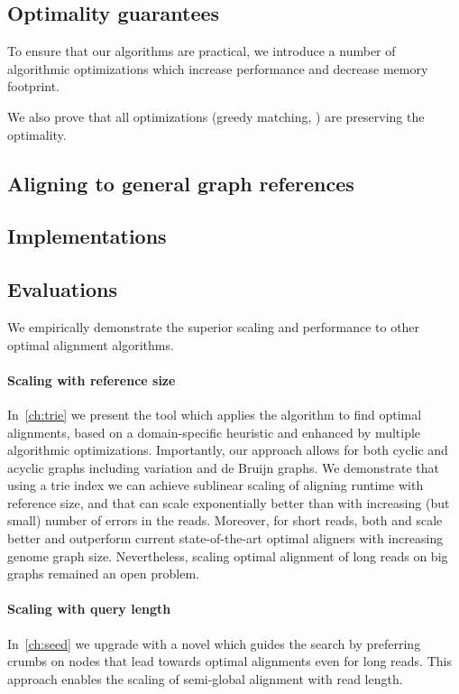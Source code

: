 

\subsection*{Optimality guarantees}
To ensure that our algorithms are practical, we introduce a number of
algorithmic optimizations which increase performance and decrease memory
footprint.

We also prove that all optimizations (greedy matching, ) are preserving the optimality.



\subsection*{Aligning to general graph references}

\subsection*{Implementations}

\subsection*{Evaluations}

We empirically demonstrate the superior scaling and performance to other optimal
alignment algorithms.

\paragraph{Scaling with reference size}
In~\cref{ch:trie} we present the tool \astarix which applies the \A algorithm to
find optimal alignments, based on a domain-specific heuristic and enhanced by
multiple algorithmic optimizations. Importantly, our approach allows for both
cyclic and acyclic graphs including variation and de Bruijn graphs. We
demonstrate that using a trie index we can achieve sublinear scaling of aligning
runtime with reference size, and that \A can scale exponentially better than
\dijkstra with increasing (but small) number of errors in the reads. Moreover,
for short reads, both \astarix and \dijkstra scale better and outperform current
state-of-the-art optimal aligners with increasing genome graph size.
Nevertheless, scaling optimal alignment of long reads on big graphs remained an
open problem.

\paragraph{Scaling with query length}
In~\cref{ch:seed} we upgrade \astarix with a novel \sh which guides the \A
search by preferring crumbs on nodes that lead towards optimal alignments even
for long reads. This approach enables the scaling of semi-global alignment with
read length.

